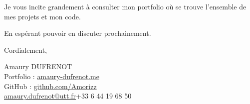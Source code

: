 \documentclass[a4paper, 10.5pt]{article}
\begin{document}
Je vous incite grandement à consulter mon portfolio où se trouve l'ensemble de mes projets et mon code.

En espérant pouvoir en discuter prochainement.

\vspace{2mm}

Cordialement,

\vspace{3mm}
{\small\color{mutedtext}Amaury DUFRENOT}\\[1.5pt]
{\small\color{mutedtext}Portfolio : \href{https://amaury-dufrenot.me}{amaury-dufrenot.me}}\\[1.5pt]
{\small\color{mutedtext}GitHub : \href{https://github.com/Amorizz}{github.com/Amorizz}}\\[1.5pt]
{\small \href{mailto:amaury.dufrenot@utt.fr}{\color{mutedtext}amaury.dufrenot@utt.fr}\hspace{6pt}{\color{sep}\textbar}\hspace{6pt}\color{mutedtext}+33 6 44 19 68 50}
\end{document}
